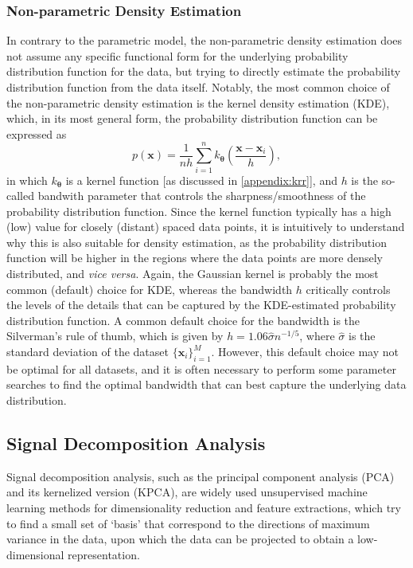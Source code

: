 \subsubsection{Non-parametric Density Estimation}
\label{appendix:non_parametric_density_estimation}

In contrary to the parametric model, the non-parametric density estimation does not assume any specific functional form for the underlying probability distribution function for the data, but trying to directly estimate the probability distribution function from the data itself. Notably, the most common choice of the non-parametric density estimation is the kernel density estimation (KDE), which, in its most general form, the probability distribution function can be expressed as
\begin{equation}
  \label{eq:KDE_density_estimate}
  p(\bm{x})=\frac{1}{nh}\sum_{i=1}^{n} k_{\boldsymbol{\theta}}\left(\frac{\bm{x}-\bm{x}_i}{h}\right),
\end{equation}
in which $k_{\boldsymbol{\theta}}$ is a kernel function [as discussed in \cref{appendix:krr}], and $h$ is the so-called bandwith parameter that controls the sharpness/smoothness of the probability distribution function. Since the kernel function typically has a high (low) value for closely (distant) spaced data points, it is intuitively to understand why this is also suitable for density estimation, as the probability distribution function will be higher in the regions where the data points are more densely distributed, and \emph{vice versa}. Again, the Gaussian kernel is probably the most common (default) choice for KDE, whereas the bandwidth $h$ critically controls the levels of the details that can be captured by the KDE-estimated probability distribution function. A common default choice for the bandwidth is the Silverman's rule of thumb,\cite{silverman1986density} which is given by $h=1.06\hat{\sigma}n^{-1/5}$, where $\hat{\sigma}$ is the standard deviation of the dataset $\{\bm{x}_i\}_{i=1}^{M}$. However, this default choice may not be optimal for all datasets, and it is often necessary to perform some parameter searches to find the optimal bandwidth that can best capture the underlying data distribution.

\subsection{Signal Decomposition Analysis} 
\label{appendix:signal_decomposition_analysis}

Signal decomposition analysis, such as the principal component analysis (PCA) and its kernelized version (KPCA), are widely used unsupervised machine learning methods for dimensionality reduction and feature extractions, which try to find a small set of `basis' that correspond to the directions of maximum variance in the data, upon which the data can be projected to obtain a low-dimensional representation.

